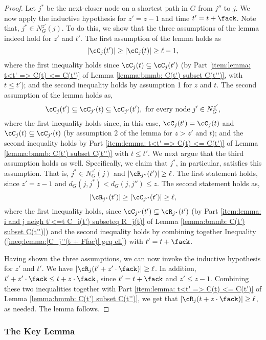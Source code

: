 \begin{proof}
Let $j^*$ be the next-closer node on a shortest path in $G$ from $j''$ to $j$.
We now apply the inductive hypothesis
for $z' = z-1$ and time $t'=t+\fack$.
Note that, $j^*\in N^{z'}_G(j)$.
To do this, we show that the three assumptions of the lemma indeed hold for $z'$ and $t'$.
The first assumption of the lemma holds as
$$|\cC_{j}(t')|\geq |\cC_{j}(t)|\geq \ell-1,$$
where the first inequality holds since
$\cC_{j}(t) \subseteq \cC_{j}(t')$
(by Part \ref{item:lemma: t<t' => C(t) <= C(t')}
of Lemma \ref{lemma:bmmb: C(t') subset C(t'')},
with $t\leq t'$);
and the second inequality holds by assumption 1 for $z$ and $t$.
The second assumption of the lemma holds as,
$$
\cC_{j}(t') \subseteq \cC_{j'}(t) \subseteq \cC_{j'}(t'), \mbox{ for every node } j' \in N_G^{z'},
$$
where the first inequality holds since, in this case, $\cC_{j}(t') = \cC_{j}(t)$ and $\cC_{j}(t) \subseteq \cC_{j'}(t)$ (by assumption 2 of the lemma for $z>z'$ and $t$);
and the second inequality holds by Part \ref{item:lemma: t<t' => C(t) <= C(t')}
of Lemma \ref{lemma:bmmb: C(t') subset C(t'')} with $t\leq t'$.
We next argue that the third assumption holds as well.
Specifically, we claim that $j^*$, in particular, satisfies this assumption.
That is,
$j^*\in N_G^{z'}(j)$ and $|\cR_{j^*}(t')| \geq \ell$.
The first statement holds, since $z'=z-1$ and $d_G(j,j^*) < d_G(j,j'')\leq z$.
The second statement holds as,
$$
|\cR_{j^*}(t')| \geq |\cC_{j''}(t')|\geq \ell,
$$
where the first inequality holds,
since $\cC_{j''}(t') \subseteq \cR_{j^*}(t')$
(by Part \ref{item:lemma: i and j neigh t'<=t C_i(t') subseteq R_j(t)}
of Lemma \ref{lemma:bmmb: C(t') subset C(t'')})
and the second inequality holds
by combining together Inequality (\ref{ineq:lemma:|C_j''(t + Ffac)| geq ell}) with $t'=t+\fack$.


Having shown the three assumptions, we can now invoke the inductive hypothesis for $z'$ and $t'$.
We have $|\cR_{j}(t'+z'\cdot \fack)| \geq \ell$.
In addition, $t'+z'\cdot \fack \leq t+z\cdot \fack$, since $t'=t+\fack$ and $z'\leq z-1$.
Combining these two inequalities together with
Part \ref{item:lemma: t<t' => C(t) <= C(t')}
of Lemma \ref{lemma:bmmb: C(t') subset C(t'')},
we get that
$|\cR_{j}(t+z\cdot \fack)| \geq \ell$, as needed.
The lemma follows.
\end{proof}






\subsubsection{The Key Lemma}
\label{subsec: The Key Lemma}

